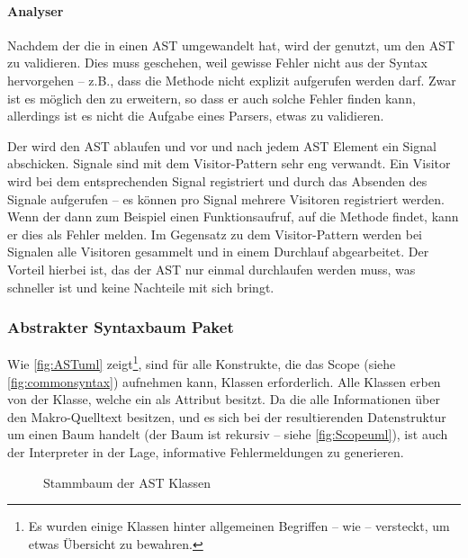       \paragraph{Analyser}
        Nachdem der  die  in einen AST umgewandelt hat, wird der  genutzt, um den AST zu validieren. Dies muss geschehen, weil gewisse Fehler nicht aus der Syntax hervorgehen -- z.B., dass die  Methode nicht explizit aufgerufen werden darf. Zwar ist es möglich den  zu erweitern, so dass er auch solche Fehler finden kann, allerdings ist es nicht die Aufgabe eines Parsers, etwas zu validieren.

        Der  wird den AST ablaufen und vor und nach jedem AST Element ein Signal abschicken. Signale sind mit dem Visitor-Pattern \autocite[S.366]{Gamma:1995:DPE:186897} sehr eng verwandt. Ein Visitor wird bei dem entsprechenden Signal registriert und durch das Absenden des Signale aufgerufen -- es können pro Signal mehrere Visitoren registriert werden. Wenn der  dann zum Beispiel einen Funktionsaufruf, auf die  Methode findet, kann er dies als Fehler melden. Im Gegensatz zu dem Visitor-Pattern werden bei Signalen alle Visitoren gesammelt und in einem Durchlauf abgearbeitet. Der Vorteil hierbei ist, das der AST nur einmal durchlaufen werden muss, was schneller ist und keine Nachteile mit sich bringt.

    \subsubsection{Abstrakter Syntaxbaum Paket}
    \label{sssec:Abstrakter Syntaxbaum Paket}
      Wie \autoref{fig:ASTuml} zeigt\footnote{
        Es wurden einige Klassen hinter allgemeinen Begriffen -- wie  -- versteckt, um etwas Übersicht zu bewahren.
      }, sind für alle Konstrukte, die das Scope (siehe \autoref{fig:commonsyntax}) aufnehmen kann, Klassen erforderlich. Alle Klassen erben von der  Klasse, welche ein  als Attribut besitzt. Da die  alle Informationen über den Makro-Quelltext besitzen, und es sich bei der resultierenden Datenstruktur um einen Baum handelt (der Baum ist rekursiv -- siehe \autoref{fig:Scopeuml}), ist auch der Interpreter in der Lage, informative Fehlermeldungen zu generieren.
      \begin{figure}[H]
        \centering
        \caption{Stammbaum der AST Klassen}
        \label{fig:ASTuml}
      \end{figure}

